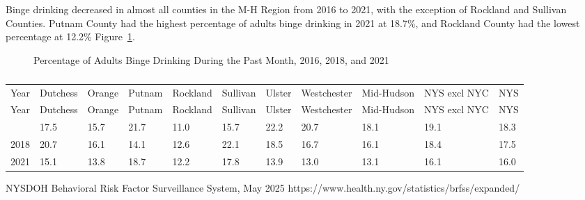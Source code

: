 \documentclass[
  english,
  letterpaper,
]{report}
\begin{document}
Binge drinking decreased in almost all counties in the M-H Region from
2016 to 2021, with the exception of Rockland and Sullivan Counties.
Putnam County had the highest percentage of adults binge drinking in
2021 at 18.7\%, and Rockland County had the lowest percentage at 12.2\%
Figure~\ref{fig-adult-bingedrink-percent}.

\begin{figure}


\caption{\label{fig-adult-bingedrink-percent}Percentage of Adults Binge
Drinking During the Past Month, 2016, 2018, and 2021}

\end{figure}%

\begin{longtable}[]{@{}lllllllllll@{}}

\caption{\label{tbl-adult-bingedrink-percent}Percentage of Adults Binge
Drinking During the Past Month, 2016, 2018, and 2021}

\tabularnewline

\caption{}\label{T_5dd77}\tabularnewline
\toprule\noalign{}
Year & Dutchess & Orange & Putnam & Rockland & Sullivan & Ulster &
Westchester & Mid-Hudson & NYS excl NYC & NYS \\
\midrule\noalign{}
\endfirsthead
\toprule\noalign{}
Year & Dutchess & Orange & Putnam & Rockland & Sullivan & Ulster &
Westchester & Mid-Hudson & NYS excl NYC & NYS \\
\midrule\noalign{}
\endhead
\bottomrule\noalign{}
\endlastfoot
2016 & 17.5 & 15.7 & 21.7 & 11.0 & 15.7 & 22.2 & 20.7 & 18.1 & 19.1 &
18.3 \\
2018 & 20.7 & 16.1 & 14.1 & 12.6 & 22.1 & 18.5 & 16.7 & 16.1 & 18.4 &
17.5 \\
2021 & 15.1 & 13.8 & 18.7 & 12.2 & 17.8 & 13.9 & 13.0 & 13.1 & 16.1 &
16.0 \\

\end{longtable}

\begin{tcolorbox}[enhanced jigsaw, breakable, leftrule=.75mm, title=\textcolor{quarto-callout-note-color}{\faInfo}\hspace{0.5em}{Source}, bottomrule=.15mm, opacityback=0, left=2mm, colback=white, bottomtitle=1mm, coltitle=black, colbacktitle=quarto-callout-note-color!10!white, colframe=quarto-callout-note-color-frame, opacitybacktitle=0.6, toptitle=1mm, titlerule=0mm, arc=.35mm, rightrule=.15mm, toprule=.15mm]

NYSDOH Behavioral Risk Factor Surveillance System, May 2025
https://www.health.ny.gov/statistics/brfss/expanded/

\end{tcolorbox}
\end{document}

